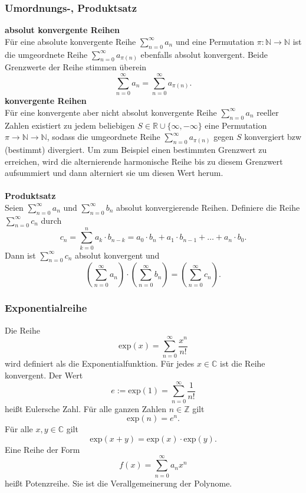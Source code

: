 \documentclass[a4paper,12pt]{article}
\numberwithin{equation}{section}
\begin{document}
\subsubsection{Umordnungs-, Produktsatz}
\textbf{absolut konvergente Reihen}\\ 
Für eine absolute konvergente Reihe $\sum_{n=0}^{\infty}a_n$ und eine Permutation $\pi :\mathbb{N}\rightarrow \mathbb{N}$ ist die umgeordnete Reihe $\sum_{n=0}^{\infty}a_{\pi \left(n\right)}$ ebenfalls absolut konvergent. Beide Grenzwerte der Reihe stimmen überein
\[ 
        \sum_{n=0}^{\infty}a_n=\sum_{n=0}^{\infty}a_{\pi \left(n\right)}
.\] 
\textbf{konvergente Reihen}\\ 
Für eine konvergente aber nicht absolut konvergente Reihe $\sum_{n=0}^{\infty}a_n$ reeller Zahlen existiert zu jedem beliebigen $S \in \mathbb{R}\cup \{\infty,-\infty\}$ eine Permutation $\pi \rightarrow \mathbb{N}\rightarrow \mathbb{N}$, sodass die umgeordnete Reihe $\sum_{n=0}^{\infty}a_{\pi \left(n\right)}$ gegen $S$ konvergiert bzw (bestimmt) divergiert. Um zum Beispiel einen bestimmten Grenzwert zu erreichen, wird die alternierende harmonische Reihe bis zu diesem Grenzwert aufsummiert und dann \glqq alterniert sie um diesen Wert herum\grqq.
\\\hfill\\\textbf{Produktsatz}\\ 
Seien $\sum_{n=0}^{\infty}a_n$ und $\sum_{n=0}^{\infty}b_n$ absolut konvergierende Reihen. Definiere die Reihe $\sum_{n=0}^{\infty}c_n$ durch
\[ 
        c_n=\sum_{k=0}^{n}a_k\cdot b_{n-k}=a_0\cdot b_n+a_1\cdot b_{n-1}+\hdots+a_n\cdot b_0
.\] 
Dann ist $\sum_{n=0}^{\infty}c_n$ absolut konvergent und
\[ 
        \left(\sum_{n=0}^{\infty}a_n\right)\cdot \left(\sum_{n=0}^{\infty}b_n\right)=\left(\sum_{n=0}^{\infty}c_n\right)
.\] 

\subsubsection{Exponentialreihe}
Die Reihe
\[ 
        \text{exp}\left(x\right)=\sum_{n=0}^{\infty}\dfrac{x^{n}}{n!}
\] 
wird definiert als die Exponentialfunktion. Für jedes $x \in \mathbb{C}$ ist die Reihe konvergent. Der Wert
\[ 
        e:=\text{exp}\left(1\right)=\sum_{n=0}^{\infty}\dfrac{1}{n!}
\] 
heißt Eulersche Zahl. Für alle ganzen Zahlen $n  \in \mathbb{Z}$ gilt
\[ 
        \text{exp}\left(n\right)=e^{n}
.\] 
Für alle $x,y \in \mathbb{C}$ gilt
\[ 
        \text{exp}\left(x+y\right)=\text{exp}\left(x\right)\cdot \text{exp}\left(y\right)
.\] 
Eine Reihe der Form 
\[ 
        f\left(x\right)=\sum_{n=0}^{\infty}a_nx^{n}
\] 
heißt Potenzreihe. Sie ist die Verallgemeinerung der Polynome.
\end{document}

